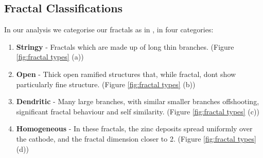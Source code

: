 \documentclass{article}
\theoremstyle{definition}
\theoremstyle{remark}
\begin{document}
\subsection{Fractal Classifications}
\indent In our analysis we categorise our fractals as in \cite{PhysRevLett.56.1260}, in four categories:
\begin{enumerate}
        \item \textbf{Stringy} - Fractals which are made up of long thin branches. (Figure \ref{fig:fractal types} (a))
        \item \textbf{Open} - Thick open ramified structures that, while fractal, dont show particularly fine structure. (Figure \ref{fig:fractal types} (b))
        \item \textbf{Dendritic} - Many large branches, with similar smaller branches offshooting, significant fractal behaviour and self similarity. (Figure \ref{fig:fractal types} (c))
        \item \textbf{Homogeneous} - In these fractals, the zinc deposits spread uniformly over the cathode, and the fractal dimension closer to 2. (Figure \ref{fig:fractal types} (d))
\end{enumerate}
\end{document}
